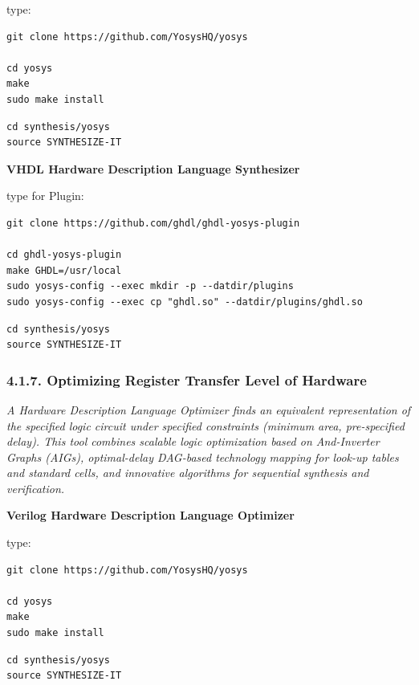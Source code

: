 \documentclass[]{article}
\begin{document}
type:

\begin{verbatim}
git clone https://github.com/YosysHQ/yosys

cd yosys
make
sudo make install
\end{verbatim}

\begin{verbatim}
cd synthesis/yosys
source SYNTHESIZE-IT
\end{verbatim}

\textbf{VHDL Hardware Description Language Synthesizer}

type for Plugin:

\begin{verbatim}
git clone https://github.com/ghdl/ghdl-yosys-plugin

cd ghdl-yosys-plugin
make GHDL=/usr/local
sudo yosys-config --exec mkdir -p --datdir/plugins
sudo yosys-config --exec cp "ghdl.so" --datdir/plugins/ghdl.so
\end{verbatim}

\begin{verbatim}
cd synthesis/yosys
source SYNTHESIZE-IT
\end{verbatim}

\subsubsection{4.1.7. Optimizing Register Transfer Level of
Hardware}\label{optimizing-register-transfer-level-of-hardware}

\emph{A Hardware Description Language Optimizer finds an equivalent
representation of the specified logic circuit under specified
constraints (minimum area, pre-specified delay). This tool combines
scalable logic optimization based on And-Inverter Graphs (AIGs),
optimal-delay DAG-based technology mapping for look-up tables and
standard cells, and innovative algorithms for sequential synthesis and
verification.}

\textbf{Verilog Hardware Description Language Optimizer}

type:

\begin{verbatim}
git clone https://github.com/YosysHQ/yosys

cd yosys
make
sudo make install
\end{verbatim}

\begin{verbatim}
cd synthesis/yosys
source SYNTHESIZE-IT
\end{verbatim}
\end{document}
